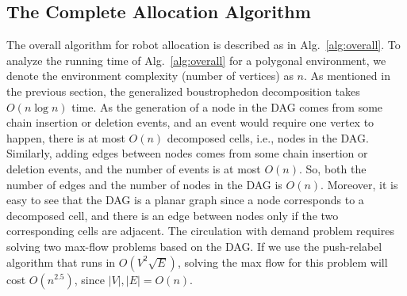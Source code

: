 \subsection{The Complete Allocation Algorithm}
The overall algorithm for robot allocation is described as in Alg.~\ref{alg:overall}.
To analyze the running time of Alg.~\ref{alg:overall} for a polygonal environment, 
we denote the environment complexity (number of vertices) as $n$. 
As mentioned in the previous section, the generalized boustrophedon decomposition takes $O(n\log n)$ time. 
As the generation of a node in the DAG comes from some chain insertion or deletion events, and an event would require one vertex to happen, 
there is at most $O(n)$ decomposed cells, i.e., nodes in the DAG. 
Similarly, adding edges between nodes comes from some chain insertion or deletion events, and the number of events is at most $O(n)$. 
So, both the number of edges and the number of nodes in the DAG is $O(n)$.
Moreover, it is easy to see that the DAG is a planar graph since a node corresponds to a decomposed cell, and there is an edge between nodes only if the two corresponding cells are adjacent.
The circulation with demand problem requires solving two max-flow problems based on the DAG. 
If we use the push-relabel algorithm \cite{cheriyan1989analysis} that runs in $O(V^2\sqrt{E})$, solving the max flow for this problem will cost $O(n^{2.5})$, 
since $|V|, |E| = O(n)$.%

